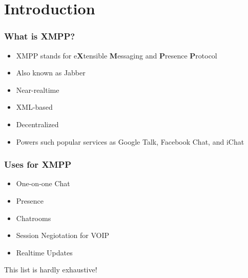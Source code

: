 \part{Introduction}

\newpage
\section*{What is XMPP?}
\pause

\begin{itemize}
\item XMPP stands for e\textbf{X}tensible \textbf{M}essaging and \textbf{P}resence \textbf{P}rotocol
\pause
\item Also known as Jabber
\pause
\item Near-realtime
\pause
\item XML-based
\pause
\item Decentralized
\pause
\item Powers such popular services as Google Talk, Facebook Chat, and iChat
\end{itemize}

\newpage
\section*{Uses for XMPP}
\pause

\begin{itemize}
\item One-on-one Chat
\pause
\item Presence
\pause
\item Chatrooms
\pause
\item Session Negiotation for VOIP
\pause
\item Realtime Updates
\end{itemize}

\pause
\vfill
This list is hardly exhaustive!
